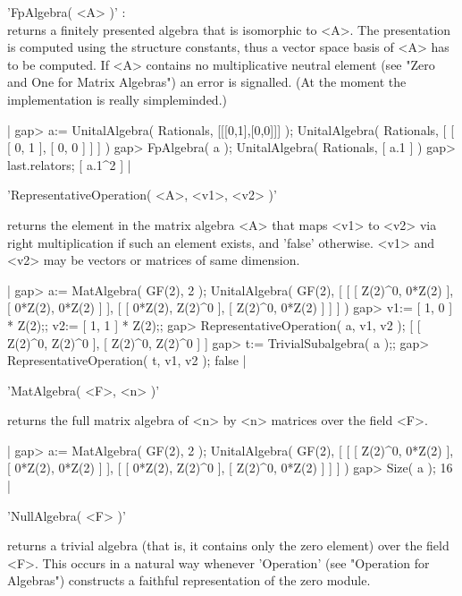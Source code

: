 'FpAlgebra( <A> )' : \\
    returns a finitely presented algebra that is isomorphic to <A>.
    The presentation is computed using the structure constants, thus
    a vector space basis of <A> has to be computed.
    If <A> contains no multiplicative neutral element (see "Zero and One
    for Matrix Algebras") an error is signalled.
    (At the moment the implementation is really simpleminded.)

|    gap> a:= UnitalAlgebra( Rationals, [[[0,1],[0,0]]] );
    UnitalAlgebra( Rationals, [ [ [ 0, 1 ], [ 0, 0 ] ] ] )
    gap> FpAlgebra( a );
    UnitalAlgebra( Rationals, [ a.1 ] )
    gap> last.relators;
    [ a.1^2 ] |


'RepresentativeOperation( <A>, <v1>, <v2> )'

returns the element in the matrix algebra <A> that maps <v1> to <v2>
via right multiplication if such an element exists, and 'false'
otherwise.  <v1> and <v2> may be vectors or matrices of same dimension.

|    gap> a:= MatAlgebra( GF(2), 2 );
    UnitalAlgebra( GF(2), [ [ [ Z(2)^0, 0*Z(2) ], [ 0*Z(2), 0*Z(2) ] ], 
      [ [ 0*Z(2), Z(2)^0 ], [ Z(2)^0, 0*Z(2) ] ] ] )
    gap> v1:= [ 1, 0 ] * Z(2);; v2:= [ 1, 1 ] * Z(2);;
    gap> RepresentativeOperation( a, v1, v2 );
    [ [ Z(2)^0, Z(2)^0 ], [ Z(2)^0, Z(2)^0 ] ]
    gap> t:= TrivialSubalgebra( a );;
    gap> RepresentativeOperation( t, v1, v2 );
    false |


'MatAlgebra( <F>, <n> )'

returns the full matrix algebra of <n> by <n> matrices over the field <F>.

|    gap> a:= MatAlgebra( GF(2), 2 );
    UnitalAlgebra( GF(2), [ [ [ Z(2)^0, 0*Z(2) ], [ 0*Z(2), 0*Z(2) ] ], 
      [ [ 0*Z(2), Z(2)^0 ], [ Z(2)^0, 0*Z(2) ] ] ] )
    gap> Size( a );
    16 |


'NullAlgebra( <F> )'

returns a trivial algebra (that is, it contains only the zero element)
over the field <F>.
This occurs in a natural way whenever 'Operation' (see "Operation for
Algebras") constructs a faithful representation of the zero module.

